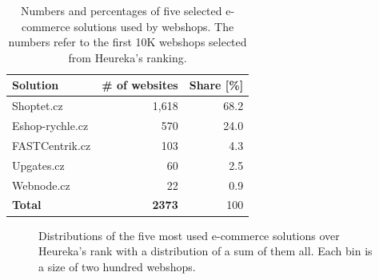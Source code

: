     \begin{table}[h!]
        \centering
        \bgroup
        \def\arraystretch{1.65}
            \begin{tabular}{l|r|r}
                \toprule
                \textbf{Solution}    & \multicolumn{1}{r|}{\textbf{\# of websites}}  & \multicolumn{1}{r}{\textbf{Share [\%]}} \\ \hline
                Shoptet.cz           & 1,618                                         &  68.2                                  \\
                Eshop-rychle.cz      & 570                                          &  24.0                                  \\
                FASTCentrik.cz       & 103                                          &  4.3                                   \\
                Upgates.cz           & 60                                           &  2.5                                   \\
                Webnode.cz           & 22                                           &  0.9                                   \\ \hline
                \textbf{Total}       & \textbf{2373}                                &  100
            \end{tabular}
        \egroup
        \caption{Numbers and percentages of five selected e-commerce solutions used by webshops. The numbers refer to the first 10K webshops selected from Heureka's ranking.}
        \label{table:ecommerce-solutions}
    \end{table}
    
    \begin{figure}
        \begin{center}
            
        \end{center}
        \caption{Distributions of the five most used e-commerce solutions over Heureka's rank with a distribution of a sum of them all. Each bin is a size of two hundred webshops.}
        \label{fig:ecommerce-solutions-histograms}
    \end{figure}
    
